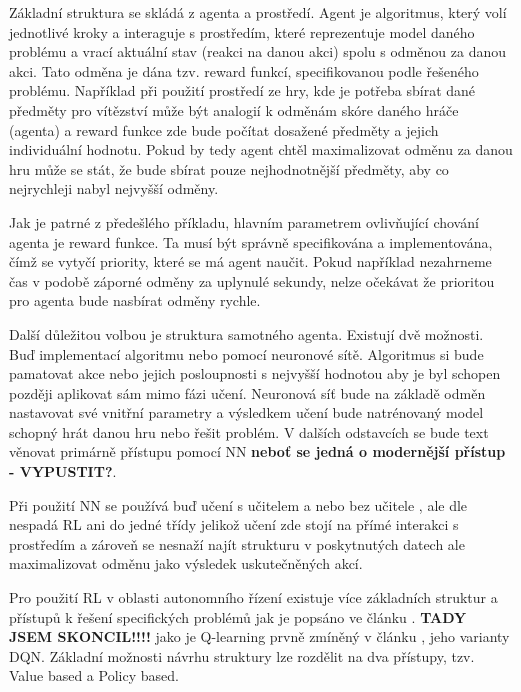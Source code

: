 \documentclass[czech, bc, kky, he, iso690alph]{fasthesis}
\begin{document}
            Základní struktura se skládá z agenta a prostředí. Agent je algoritmus, který volí jednotlivé kroky a interaguje s prostředím, které reprezentuje model daného problému a vrací aktuální stav (reakci na danou akci) spolu s odměnou za danou akci. Tato odměna je dána tzv. reward funkcí, specifikovanou podle řešeného problému. Například při použití prostředí ze hry, kde je potřeba sbírat dané předměty pro vítězství může být analogií k odměnám skóre daného hráče (agenta) a reward funkce zde bude počítat dosažené předměty a jejich individuální hodnotu. Pokud by tedy agent chtěl maximalizovat odměnu za danou hru může se stát, že bude sbírat pouze nejhodnotnější předměty, aby co nejrychleji nabyl nejvyšší odměny.
            
            Jak je patrné z předešlého příkladu, hlavním parametrem ovlivňující chování agenta je reward funkce. Ta musí být správně specifikována a implementována, čímž se vytyčí priority, které se má agent naučit. Pokud například nezahrneme čas v podobě záporné odměny za uplynulé sekundy, nelze očekávat že prioritou pro agenta bude nasbírat odměny rychle.
            
            Další důležitou volbou je struktura samotného agenta. Existují dvě možnosti. Buď implementací algoritmu nebo pomocí neuronové sítě. Algoritmus si bude pamatovat akce nebo jejich posloupnosti s nejvyšší hodnotou aby je byl schopen později aplikovat sám mimo fázi učení. Neuronová síť bude na základě odměn nastavovat své vnitřní parametry a výsledkem učení bude natrénovaný model schopný hrát danou hru nebo řešit problém. V dalších odstavcích se bude text věnovat primárně přístupu pomocí NN\textbf{ neboť se jedná o modernější přístup - VYPUSTIT?}.
            
            Při použití NN se používá buď učení s učitelem a nebo bez učitele , ale dle \cite[p.~2]{RLbook} nespadá RL ani do jedné třídy jelikož učení zde stojí na přímé interakci s prostředím a zároveň se nesnaží najít strukturu v poskytnutých datech ale maximalizovat odměnu jako výsledek uskutečněných akcí.
            
            Pro použití RL v oblasti autonomního řízení existuje více základních struktur a přístupů k řešení specifických problémů jak je popsáno ve článku \cite{Deep_RL_survey}. \textbf{TADY JSEM SKONCIL!!!!} jako je Q-learning prvně zmíněný v článku \cite{vanilla_Q-learning}, jeho varianty DQN. Základní možnosti návrhu struktury lze rozdělit na dva přístupy, tzv. Value based a Policy based.
            
\end{document}
